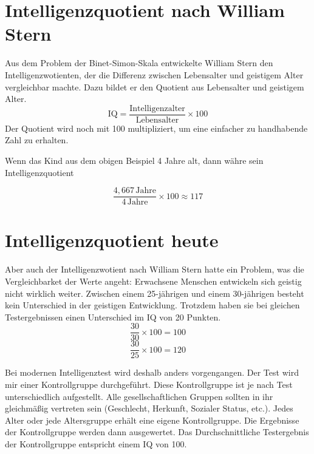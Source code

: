 \section{Intelligenzquotient nach William Stern}
Aus dem Problem der Binet-Simon-Skala entwickelte William Stern den Intelligenzwotienten, der die Differenz zwischen Lebensalter und geistigem Alter vergleichbar machte. Dazu bildet er den Quotient aus Lebensalter und geistigem Alter.
$$ \mathrm{IQ} = \frac{\mathrm{Intelligenzalter}}{\mathrm{Lebensalter}} \times 100 $$
Der Quotient wird noch mit 100 multipliziert, um eine einfacher zu handhabende Zahl zu erhalten.

Wenn das Kind aus dem obigen Beispiel 4 Jahre alt, dann währe sein Intelligenzquotient

$$ \frac{4,667\,\mathrm{Jahre}}{4\,\mathrm{Jahre}} \times 100 \approx 117 $$

\section{Intelligenzquotient heute}
Aber auch der Intelligenzwotient nach William Stern hatte ein Problem, was die Vergleichbarket der Werte angeht: Erwachsene Menschen entwickeln sich geistig nicht wirklich weiter. Zwischen einem 25-jährigen und einem 30-jährigen besteht kein Unterschied in der geistigen Entwicklung. Trotzdem haben sie bei gleichen Testergebnissen einen Unterschied im IQ von 20 Punkten.
$$ \frac{30}{30} \times 100 = 100 $$
$$ \frac{30}{25} \times 100 = 120 $$

Bei modernen Intelligenztest wird deshalb anders vorgengangen. Der Test wird mir einer Kontrollgruppe durchgeführt. Diese Kontrollgruppe ist je nach Test unterschiedlich aufgestellt. Alle gesellschaftlichen Gruppen sollten in ihr gleichmäßig vertreten sein (Geschlecht, Herkunft, Sozialer Status, etc.). Jedes Alter oder jede Altersgruppe erhält eine eigene Kontrollgruppe. Die Ergebnisse der Kontrollgruppe werden dann ausgewertet. Das Durchschnittliche Testergebnis der Kontrollgruppe entspricht einem IQ von 100.
